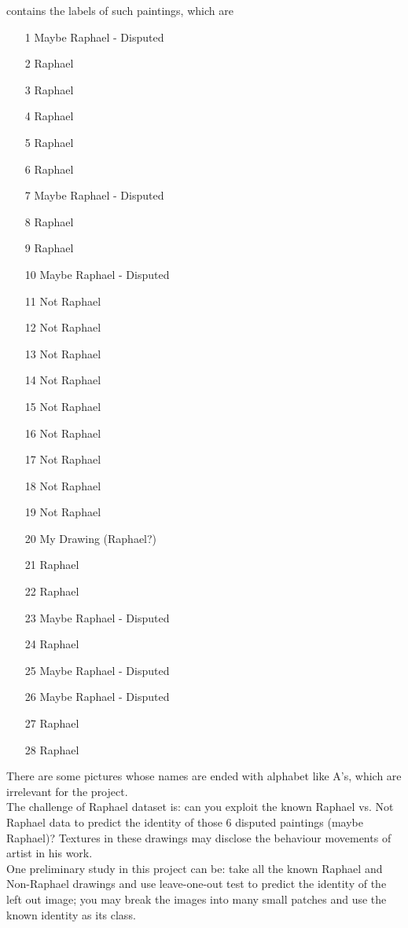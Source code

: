 \documentclass[11pt]{article}
\begin{document}
\noindent contains the labels of such paintings, which are 
\begin{enumerate}
\item[1] Maybe Raphael - Disputed
\item[2] Raphael
\item[3] Raphael
\item[4] Raphael
\item[5] Raphael
\item[6] Raphael
\item[7] Maybe Raphael - Disputed
\item[8] Raphael
\item[9] Raphael
\item[10] Maybe Raphael - Disputed
\item[11] Not Raphael
\item[12] Not Raphael
\item[13] Not Raphael
\item[14] Not Raphael
\item[15] Not Raphael
\item[16] Not Raphael
\item[17] Not Raphael
\item[18] Not Raphael
\item[19] Not Raphael
\item[20] My Drawing (Raphael?)
\item[21] Raphael
\item[22] Raphael
\item[23] Maybe Raphael - Disputed
\item[24] Raphael
\item[25] Maybe Raphael - Disputed
\item[26] Maybe Raphael - Disputed
\item[27] Raphael
\item[28] Raphael
\end{enumerate}

There are some pictures whose names are ended with alphabet like A's, which are irrelevant for the project. \\

The challenge of Raphael dataset is: can you exploit the known Raphael vs. Not Raphael data to predict the identity of those 6 disputed paintings (maybe Raphael)? Textures in these drawings may disclose the behaviour movements of artist in his work.\\

One preliminary study in this project can be: take all the known Raphael and Non-Raphael drawings and use leave-one-out test to predict the identity of the left out image; you may break the images into many small patches and use the known identity as its class.\\
\end{document}
